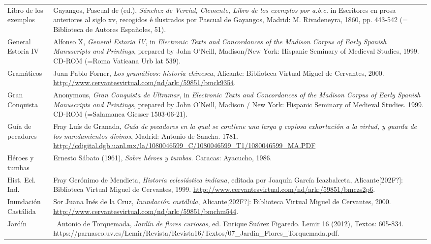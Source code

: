 \begin{flushleft}
\begin{supertabular}{m{1.7955599in}m{4.42126in}}
\\
Libro de los exemplos &
Gayangos, Pascual de (ed.), \textit{Sánchez de Vercial, Clemente, Libro de los exemplos por a.b.c.} in Escritores en prosa anteriores al siglo xv, recogidos é ilustrados por Pascual de Gayangos, Madrid: M. Rivadeneyra, 1860, pp. 443-542 (= Biblioteca de Autores Españoles, 51).\\
General Estoria IV  &
Alfonso X, \textit{General Estoria IV}, in \textit{Electronic Texts and Concordances of the Madison Corpus of Early Spanish Manuscripts and Printings},\textit{ }prepared by John O’Neill, Madison/New York: Hispanic Seminary of Medieval Studies, 1999. CD-ROM (=Roma Vaticana Urb lat 539).\\
Gramáticos  &
Juan Pablo Forner, \textit{Los gramáticos: historia chinesca}, Alicante: Biblioteca Virtual Miguel de Cervantes, 2000. \url{http://www.cervantesvirtual.com/nd/ark:/59851/bmck9354}.\\
Gran Conquista  &
Anonymous,\textit{ Gran Conquista de Ultramar}, in \textit{Electronic Texts and Concordances of the Madison Corpus of Early Spanish Manuscripts and Printings}, prepared by John O’Neill, Madison / New York: Hispanic Seminary of Medieval Studies. 1999. CD-ROM (=Salamanca Giesser 1503-06-21).\\
Guía de pecadores  &
Fray Luís de Granada, \textit{Guía de pecadores en la qual se contiene una larga y copiosa exhortación a la virtud, y guarda de los mandamientos divinos}, Madrid: Antonio de Sancha. 1781. \url{http://cdigital.dgb.uanl.mx/la/1080046599_C/1080046599_T1/1080046599_MA.PDF}\\
Héroes y tumbas  &
Ernesto Sábato (1961), \textit{Sobre héroes y tumbas}. Caracas: Ayacucho, 1986.\\
Hist. Ecl. Ind.  &
Fray Gerónimo de Mendieta, \textit{Historia eclesiástica indiana}, editada por Joaquín García Icazbalceta, Alicante[202F?]: Biblioteca Virtual Miguel de Cervantes, 1999. \url{http://www.cervantesvirtual.com/nd/ark:/59851/bmczs2p6}.\\
Inundación Castálida  &
Sor Juana Inés de la Cruz, \textit{Inundación castálida},\textit{ }Alicante[202F?]: Biblioteca Virtual Miguel de Cervantes, 2000. \url{http://www.cervantesvirtual.com/nd/ark:/59851/bmchm544}.\\
Jardín  &
\ Antonio de Torquemada, \textit{Jardín de flores curiosas}, ed. Enrique Suárez Figaredo. Lemir 16 (2012), Textos: 605-834. https://parnaseo.uv.es/Lemir/Revista/Revista16/Textos/07\_Jardin\_Flores\_Torquemada.pdf.\\

\end{supertabular}
\end{flushleft}
